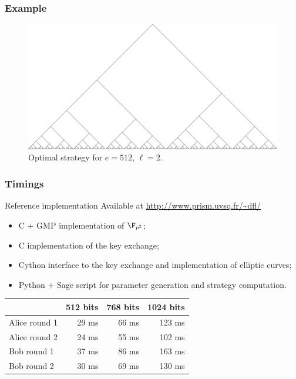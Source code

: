 \documentclass{beamer}
\begin{document}

\begin{frame}
\frametitle{Example}
\begin{figure}[t]
  \centering
  \includegraphics[width=\textwidth]{optimal.png}
  \caption{Optimal strategy for $e=512$, $\ell=2$.}
  \label{fig:optimal}
\end{figure}
\end{frame}


\begin{frame}
  \frametitle{Timings}
  
  \begin{block}{Reference implementation}
    Available at \alert{\url{http://www.prism.uvsq.fr/~dfl/}}
    \begin{itemize}
    \item C + GMP implementation of $\F_{p^2}$;
    \item C implementation of the key exchange;
    \item Cython interface to the key exchange and implementation of
      elliptic curves;
    \item Python + Sage script for parameter generation and strategy computation.
    \end{itemize}
  \end{block}

  \begin{center}
    \begin{tabular}{l r r r}
      \hline
      & 512 bits & 768 bits & 1024 bits\\
      \hline
      Alice round 1 & 29 ms & 66 ms & 123 ms \\
      Alice round 2 & 24 ms & 55 ms & 102 ms \\
      Bob round 1 & 37 ms & 86 ms & 163 ms \\
      Bob round 2 & 30 ms & 69 ms & 130 ms
    \end{tabular}
  \end{center}
\end{frame}
\end{document}
